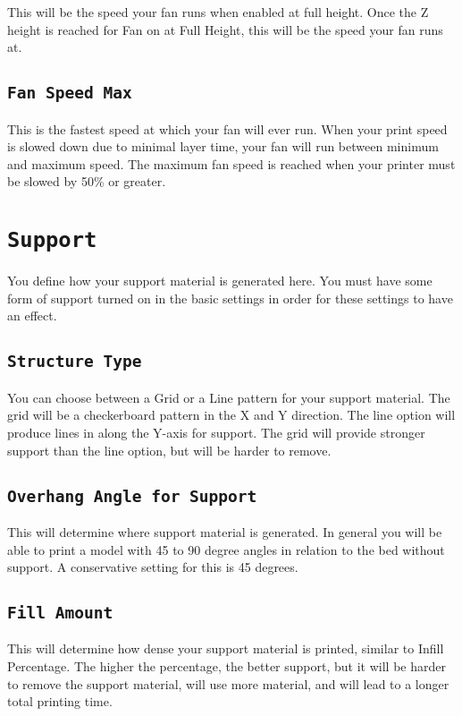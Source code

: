 This will be the speed your fan runs when enabled at full height. Once the Z height is reached for Fan on at Full Height, this will be the speed your fan runs at.

\subsection{\texttt{Fan Speed Max}}
This is the fastest speed at which your fan will ever run. When your print speed is slowed down due to minimal layer time, your fan will run between minimum and maximum speed. The maximum fan speed is reached when your printer must be slowed by 50\% or greater.

\section{\texttt{Support}}
You define how your support material is generated here. You must have some form of support turned on in the basic settings in order for these settings to have an effect.

\subsection{\texttt{Structure Type}}
You can choose between a Grid or a Line pattern for your support material. The grid will be a checkerboard pattern in the X and Y direction. The line option will produce lines in along the Y-axis for support. The grid will provide stronger support than the line option, but will be harder to remove.

\subsection{\texttt{Overhang Angle for Support}}
This will determine where support material is generated. In general you will be able to print a model with 45 to 90 degree angles in relation to the bed without support. A conservative setting for this is 45 degrees.

\subsection{\texttt{Fill Amount}}
This will determine how dense your support material is printed, similar to Infill Percentage. The higher the percentage, the better support, but it will be harder to remove the support material, will use more material, and will lead to a longer total printing time.

